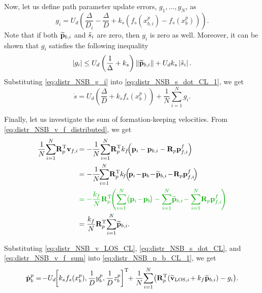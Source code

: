 Now, let us define path parameter update errors, $g_1, \ldots, g_N$, as
\begin{equation}
    g_i = U_{d\!} \left(\!\frac{\Delta}{D_i} - \frac{\Delta}{D} + k_s \! \left(f_{s\!\!}\left(x_{b, i\!}^p\right) - f_{s\!}\left(x_{b\!}^p\right)\right)\!\right).
    \label{eq:distr_NSB_g_i}
\end{equation}
Note that if both $\widetilde{\mathbf{p}}_{b, i}$ and $\Tilde{s}_i$ are zero, then $g_i$ is zero as well.
Moreover, it can be shown that $g_i$ satisfies the following inequality
\begin{equation}
    \left|g_i\right| \leq U_d \left(\frac{1}{\Delta} + k_s\right) \left\|\widetilde{\mathbf{p}}_{b, i}\right\| + U_d k_s \left|\Tilde{s}_i\right|.
    \label{eq:distr_NSB_g_i_bound}
\end{equation}
Substituting \eqref{eq:distr_NSB_g_i} into \eqref{eq:distr_NSB_s_dot_CL_1}, we get
\begin{equation}
    \dot{s} = U_{d\!} \left(\!\frac{\Delta}{D} + k_s f_{s\!}\left(x_{b\!}^p\right)\right) + \frac{1}{N} \sum_{i=1}^N g_i.
    \label{eq:distr_NSB_s_dot_CL}
\end{equation}

Finally, let us investigate the sum of formation-keeping velocities.
From \eqref{eq:distr_NSB_v_f_distributed}, we get
\begin{equation}
    \begin{split}
    \frac{1}{N} \! \sum_{i=1}^N \! \mat{R}_p\T \ivel_{f, i\!} &= -\frac{1}{N} \! \sum_{i=1}^N \! \mat{R}_p\T k_f \!\! \left(\mat{p}_i - \mat{p}_{b,i} - \mat{R}_p\mat{p}_{f, i}^f\right) \\
    &= -\frac{1}{N} \!\! \sum_{i=1}^N \! \mat{R}_p\T k_{\!f\!} \! \left(\! \mat{p}_{i\!} -\! \mat{p}_{b\!} -\! \widetilde{\mat{p}}_{b, i\!} -\! \mat{R}_p\mat{p}_{f, i\!}^f\right) \\
    &\dm{= -\frac{k_f}{N} \mat{R}_p\T \!\! \left( \sum_{i=1}^N \bigl(\mat{p}_{i\!} -\! \mat{p}_{b\!}\bigr) - \sum_{i=1}^N\! \widetilde{\mat{p}}_{b, i\!} - \sum_{i=1}^N\! \mat{R}_p\mat{p}_{f, i\!}^f \right)} \\
    &= \frac{k_f}{N} \mat{R}_p\T \! \sum_{i=1}^N \! \widetilde{\mat{p}}_{b, i}.
    \end{split}
    \label{eq:distr_NSB_v_f_sum}
\end{equation}

Substituting \eqref{eq:distr_NSB_v_LOS_CL}, \eqref{eq:distr_NSB_s_dot_CL}, and \eqref{eq:distr_NSB_v_f_sum} into \eqref{eq:distr_NSB_p_b_CL_1}, we get
\begin{equation}
        \dot{\mat{p}}_b^p =\! - U_{d\!} \!\inlinevector{k_s f_s\!\left(x_b^p\right)\!, \frac{1}{D} y_b^p, \frac{1}{D} z_b^p}\!\! + \frac{1}{N}\! \sum_{i=1}^N\! \left(\mat{R}_p\T \!\left(\widetilde{\ivel}_{{\rm LOS}, i\!} + k_f \widetilde{\mat{p}}_{b, i}\right) - g_i \right)\!.
    \label{eq:distr_NSB_p_b_CL}
\end{equation}

